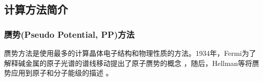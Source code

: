 %
\subsection{计算方法简介}
\subsubsection{赝势(Pseudo Potential, PP)方法}
赝势方法是使用最多的计算晶体电子结构和物理性质的方法。1934年，Fermi为了解释碱金属的原子光谱的谱线移动提出了原子赝势的概念%
\cite{NC11-157_1934,AJP52-695_1984}，随后，Hellman等将赝势应用到原子和分子能级的描述\cite{JCP3-61_1935}%
。

